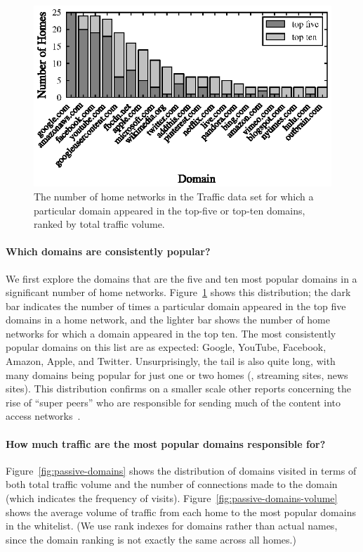 \begin{figure}[t]
  \includegraphics[width=0.98\linewidth]{figures/bytesperdomain/top_five_and_ten_domains}
  \caption{The number of home networks in the Traffic data set for
    which a particular domain appeared in the top-five or top-ten
    domains, ranked by total traffic volume.}
  \label{fig:top-domains}
\end{figure}

\paragraph{Which domains are consistently popular?}
We first explore the domains that are the five and ten
most popular domains in a significant number of home
networks. Figure~\ref{fig:top-domains} shows this distribution; the dark
bar indicates the number of times a particular domain appeared in the top five
domains in a home network, and the lighter bar shows the number of home
networks for which a domain appeared in the top ten.  The most
consistently popular domains on this list are as expected: Google,
YouTube, Facebook, Amazon, Apple, and Twitter.  Unsurprisingly, the
tail is also quite long, with many domains being popular for just one or
two homes (\eg, streaming sites, news sites).  This distribution
confirms on a smaller scale other reports concerning the rise of
``super peers'' who are responsible for sending much of the content into
access networks~\cite{www-sandvine}.


\paragraph{How much traffic are the most popular domains responsible
  for?} 
Figure~\ref{fig:passive-domains} shows the distribution of
domains visited in terms of both total traffic volume and the
number of connections made to the domain (which indicates
the frequency of visits).
Figure~\ref{fig:passive-domains-volume} shows the average
volume of traffic from each home to the most popular domains in the
whitelist.  (We use rank indexes for domains rather than actual names, since
the domain ranking is not exactly the same across all homes.)

